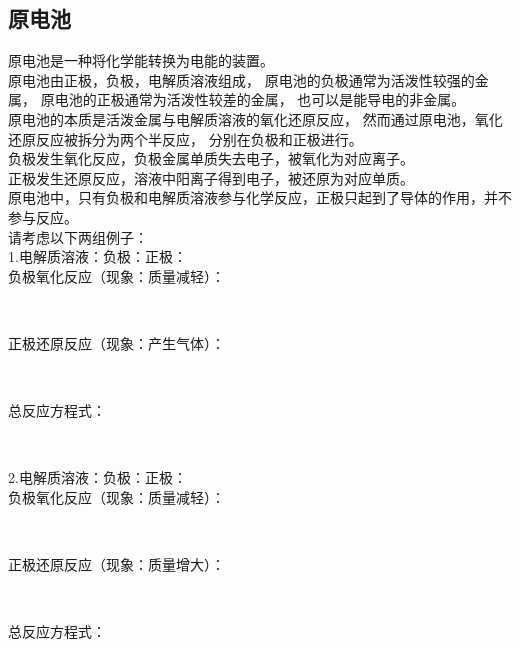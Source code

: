 \documentclass[UTF8]{ctexart}
\begin{document}
\subsection{原电池}
    原电池是一种将化学能转换为电能的装置。\\[3mm]
    原电池由正极，负极，电解质溶液组成，
    原电池的负极通常为活泼性较强的金属，
    原电池的正极通常为活泼性较差的金属，
    也可以是能导电的非金属。\\[3mm]
    原电池的本质是活泼金属与电解质溶液的氧化还原反应，
    然而通过原电池，氧化还原反应被拆分为两个半反应，
    分别在负极和正极进行。\\[2mm]
    负极发生氧化反应，负极金属单质失去电子，被氧化为对应离子。\\[1mm]
    正极发生还原反应，溶液中阳离子得到电子，被还原为对应单质。\\[3mm]
    原电池中，只有负极和电解质溶液参与化学反应，正极只起到了导体的作用，并不参与反应。\\[4mm]
    请考虑以下两组例子：\\[3mm]
    1.电解质溶液：\qquad 负极：\qquad 正极：\\[3mm]
    负极氧化反应（现象：质量减轻）：
    \begin{center}
        \\[3mm]    
    \end{center}
    正极还原反应（现象：产生气体）：
    \begin{center}
        \\[3mm]    
    \end{center}
    总反应方程式：
    \begin{center}
        \\[8mm]
    \end{center}
    2.电解质溶液：\qquad 负极：\qquad 正极：\\[3mm]
    负极氧化反应（现象：质量减轻）：
    \begin{center}
        \\[3mm]    
    \end{center}
    正极还原反应（现象：质量增大）：
    \begin{center}
        \\[3mm]    
    \end{center}
    总反应方程式：
    \begin{center}
    \end{center}
\end{document}
